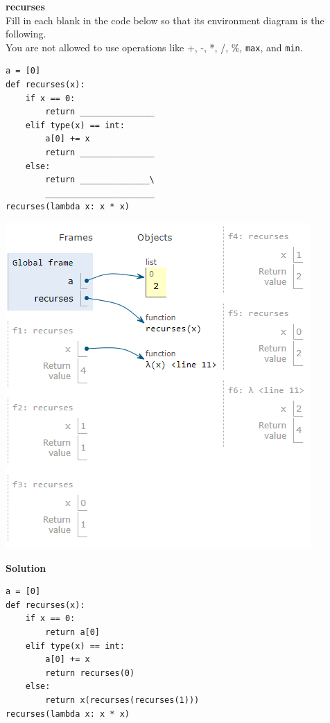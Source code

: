 \begin{blocksection}
\question
\textbf{recurses}\\
Fill in each blank in the code below so that its environment diagram is the following.\\
You are not allowed to use operations like +, -, *, /, \%, \lstinline{max}, and \lstinline{min}.

\begin{multicols}{2}
\begin{lstlisting}
a = [0]
def recurses(x):
    if x == 0:
        return _______________
    elif type(x) == int:
        a[0] += x
        return _______________
    else:
        return ______________\
        ______________________
recurses(lambda x: x * x)
\end{lstlisting}


\includegraphics[width=\linewidth]{recurses.png}
\end{multicols}
\end{blocksection}

\begin{solution}[2in]
\begin{blocksection}
\textbf{Solution}
\begin{lstlisting}
a = [0]
def recurses(x):
    if x == 0:
        return a[0]
    elif type(x) == int:
        a[0] += x
        return recurses(0)
    else:
        return x(recurses(recurses(1)))
recurses(lambda x: x * x)
\end{lstlisting}
\end{blocksection}
\end{solution}

